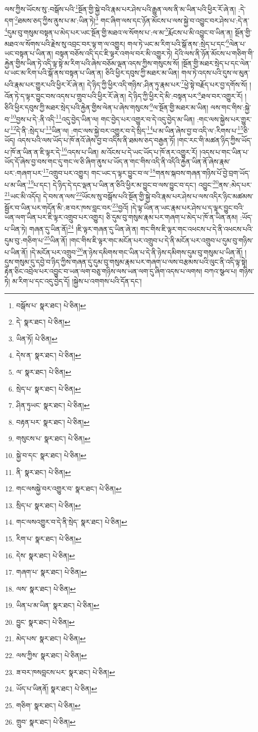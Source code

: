 ལས་ཀྱིས་ཡོངས་སུ་:བསྒོས་པའི་\footnote{བསྒོས་པ་  སྣར་ཐང་།  པེ་ཅིན། }སྔོན་གྱི་སྐྱེ་བའི་རྣམ་པར་ཤེས་པའི་རྒྱུན་ལས་ནི་མ་ཡིན་པའི་ཕྱིར་རོ་ཞེ་ན། :དེ་དག་\footnote{དེ་  སྣར་ཐང་།  པེ་ཅིན། }ཐམས་ཅད་ཀྱིས་ནུས་པ་མ་:ཡིན་ཏེ།\footnote{ཡིན་ཏོ།  པེ་ཅིན། } གང་ཞིག་ལས་དང་ཉོན་མོངས་པ་ལས་སྐྱེ་བ་འབྱུང་བར་ཤེས་པ་:དེ་ན་\footnote{དེས་ན་  སྣར་ཐང་།  པེ་ཅིན། }དུམ་བུ་གསུམ་བསྟན་པ་མེད་པར་ཡང་སྔོན་གྱི་མཐའ་ལ་སོགས་པ་:ལ་མ་\footnote{ལ་  སྣར་ཐང་།  པེ་ཅིན། }རྨོངས་པ་མི་འབྱུང་བ་ཡིན་ན། སྔོན་གྱི་མཐའ་ལ་སོགས་པའི་རྗེས་སུ་འབྲང་བར་ལྟ་ག་ལ་འགྱུར། གལ་ཏེ་ཡང་མ་རིག་པའི་སྒོ་ནས་:སྲེད་པ་དང་\footnote{སྲེད་པ་  སྣར་ཐང་།  པེ་ཅིན། }ལེན་པ་ཡང་བསྟན་པ་ཡིན་ན། བསྟན་བཅོས་འདི་དང་ཇི་ལྟར་འགལ་བར་མི་འགྱུར་ཏེ། དེའི་ལས་ནི་ཉོན་མོངས་པ་གཅིག་གི་རྐྱེན་གྱིས་ཡིན་ཏེ་འདི་ལྟ་སྟེ་མ་རིག་པའི་ཞེས་བཅོམ་ལྡན་འདས་ཀྱིས་གསུངས་སོ། །སྔོན་གྱི་མཐར་སྲེད་པ་དང་ལེན་པ་ཡང་མ་རིག་པའི་སྒོ་ནས་བསྟན་པ་ཡིན་ན། ཅིའི་ཕྱིར་དབུས་ཀྱི་མཐར་མ་ཡིན། གལ་ཏེ་འདས་པའི་དུས་ལ་མུན་པའི་རྣམ་པར་གྱུར་པའི་ཕྱིར་རོ་ཞེ་ན། དེ་ཉིད་ཀྱི་ཕྱིར་འདི་གཉིས་:ཤིན་ཏུ་རྣམ་པར་\footnote{ཤིན་ཏུཡང་  སྣར་ཐང་།  པེ་ཅིན། }ཕྱེ་སྟེ་བརྗོད་པར་བྱ་དགོས་སོ། །འོན་ཏེ་ད་ལྟར་བྱུང་བས་འདས་པ་གྲུབ་པའི་ཕྱིར་རོ་ཞེ་ན། དེ་ཉིད་ཀྱི་ཕྱིར་དེ་མི་:བསྟན་པར་\footnote{བརྟན་པར་  སྣར་ཐང་།  པེ་ཅིན། }ཐལ་བར་འགྱུར་རོ། །ཅིའི་ཕྱིར་དབུས་ཀྱི་མཐར་སྲེད་པའི་རྐྱེན་གྱིས་ལེན་པ་ཞེས་གསུངས་\footnote{གསུངས་པ་  སྣར་ཐང་།  པེ་ཅིན། }ལ་སྔོན་གྱི་མཐར་མ་ཡིན། ལས་གང་གིས་:སྐྱེ་བ་\footnote{སྐྱེ་བ་དང་  སྣར་ཐང་།  པེ་ཅིན། }བྱས་པ་དེ་:ནི་འདི་\footnote{ནི་  སྣར་ཐང་།  པེ་ཅིན། }འདུ་བྱེད་ཡིན་ལ། གང་བྱེད་པར་འགྱུར་བ་དེ་འདུ་བྱེད་མ་ཡིན། :གང་ལས་སྐྱེས་པར་གྱུར་པ་\footnote{གང་ལསསྐྱེ་བར་འགྱུར་བ་  སྣར་ཐང་།  པེ་ཅིན། }དེ་ནི་:སྲེད་པ་\footnote{སྲིད་པ་  སྣར་ཐང་།  པེ་ཅིན། }ཡིན་ལ། :གང་ལས་སྐྱེ་བར་འགྱུར་བ་དེ་སྲིད་\footnote{གང་ལསའགྱུར་བ་དེ་ནི་སྲེད་  སྣར་ཐང་།  པེ་ཅིན། }པ་མ་ཡིན་ཞེས་བྱ་བ་འདི་ལ་:རིགས་པ་\footnote{རིག་པ་  སྣར་ཐང་།  པེ་ཅིན། }ཅི་ཡོད། འདས་པའི་ལས་ཡོད་པ་ཁོ་ནའོ་ཞེས་བྱ་བ་འདིས་ནི་ཐམས་ཅད་བརྒྱན་ཏོ། །གང་རང་གི་མཚན་ཉིད་ཀྱིས་ཡོད་པ་ཁོ་ན་ཡིན་ན་ཇི་ལྟར་དེ་\footnote{དེས་  སྣར་ཐང་།  པེ་ཅིན། }འདས་པ་ཡིན། མ་འོངས་པ་དེ་ཡང་ཡོད་པ་ཁོ་ནར་འགྱུར་རོ། །འདས་པ་གང་ཡིན་པ་ཡོད་དོ་ཞེས་བྱ་བས་གང་དུ་གང་ལ་ཅི་ཞིག་ནུས་པ་ཡོད་ན་གང་གིས་འདི་ནི་འདིའི་རྐྱེན་ཡིན་ནོ་ཞེས་རྣམ་པར་:གཞག་པར་\footnote{གཞག་པ་  སྣར་ཐང་།  པེ་ཅིན། }འགྲུབ་པར་འགྱུར། གང་ཡང་ད་ལྟར་བྱུང་བ་ལ་\footnote{ལས་  སྣར་ཐང་།  པེ་ཅིན། }གནས་སྐབས་གཞན་གཉིས་པོ་བྱེ་བྲག་ཡོད་པ་མ་ཡིན་\footnote{ཡིན་པ་མ་ཡིན་  སྣར་ཐང་།  པེ་ཅིན། }པ་དང་། དེ་ཉིད་དེ་དང་ལྡན་པ་ཡིན་ན་ཅིའི་ཕྱིར་མ་བྱུང་བ་ལས་བྱུང་བ་དང་། འབྱུང་\footnote{བྱུང་  སྣར་ཐང་།  པེ་ཅིན། }ནས་:མེད་པར་\footnote{མེད་པས་  སྣར་ཐང་།  པེ་ཅིན། }ཡང་མི་འདོད། དེ་བས་ན་ལས་\footnote{ལས་ཀྱིས་  སྣར་ཐང་།  པེ་ཅིན། }ཡོངས་སུ་བསྒོས་པའི་སྔོན་གྱི་སྐྱེ་བའི་རྣམ་པར་ཤེས་པ་ལས་འདིར་ཉིང་མཚམས་སྦྱོར་བ་ཡིན་པར་གདོན་མི་:ཟ་བར་ཁས་བླང་བར་\footnote{ཟ་བར་ཁསབླངས་པར་  སྣར་ཐང་།  པེ་ཅིན། }བྱའོ། །དེ་ལྟ་ཡིན་ན་ཡང་རྣམ་པར་ཤེས་པ་ད་ལྟར་བྱུང་བའི་ཡན་ལག་ཡིན་པར་ཇི་ལྟར་འགྲུབ་པར་འགྱུར། ཅི་དུམ་བུ་གསུམ་རྣམ་པར་གཞག་པ་མེད་པ་ཁོ་ན་ཡིན་ནམ། :ཡོད་པ་ཡིན་ཏེ། གཞན་དུ་ཡིན་ནོ།\footnote{ཡོད་པ་ཡིནནོ།  སྣར་ཐང་།  པེ་ཅིན། } །ཇི་ལྟར་གཞན་དུ་ཡིན་ཞེ་ན། གང་གིས་ཇི་ལྟར་གང་འཕངས་པ་དེ་ནི་འཕངས་པའི་དུམ་བུ་:གཅིག་པ་\footnote{གཅིག་  སྣར་ཐང་།  པེ་ཅིན། }ཡིན་ནོ། །གང་གིས་ཇི་ལྟར་གང་མངོན་པར་འགྲུབ་པ་དེ་ནི་མངོན་པར་འགྲུབ་པ་དུམ་བུ་གཉིས་པ་ཡིན་ནོ། །དེ་མངོན་པར་འགྲུབ་\footnote{གྲུབ་  སྣར་ཐང་།  པེ་ཅིན། }ན་ཉེས་དམིགས་གང་ཡིན་པ་དེ་ནི་ཉེས་དམིགས་དུམ་བུ་གསུམ་པ་ཡིན་ནོ། །དུས་གསུམ་དུ་དབྱེ་བ་ཉིད་ཀྱིས་གཞན་དུ་དུམ་བུ་གསུམ་རྣམ་པར་གཞག་པ་ལས་བརྩམས་པའི་ལུང་ནི་འདི་ལྟ་སྟེ། རྟེན་ཅིང་འབྲེལ་པར་འབྱུང་བ་ཡན་ལག་བཅུ་གཉིས་ལས་ཡན་ལག་དུ་ཞིག་འདས་པ་ལགས། བཀའ་སྩལ་པ། གཉིས་ཏེ། མ་རིག་པ་དང་འདུ་བྱེད་དོ། །སྐྱེས་པ་འགགས་པའི་དོན་དང་། 